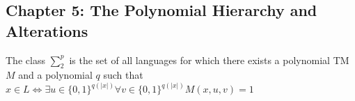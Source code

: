 \subsection*{Chapter 5: The Polynomial Hierarchy and Alterations}
\begin{note}
The class $\sum_{2}^{p}$ is the set of all languages for which there exists a polynomial TM $M$
and a polynomial $q$ such that
$x \in L \iff \exists u \in \{0,1\}^{q(|x|)} \forall v \in \{0,1\}^{q(|x|)} M(x, u, v) = 1 $
\end{note}

